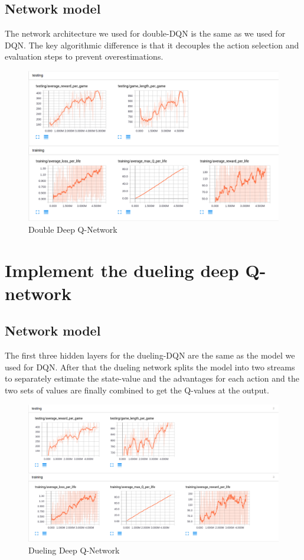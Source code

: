 \documentclass{article}
\begin{document}
\subsection*{Network model}
The network architecture we used for double-DQN is the same as we used for DQN. The key algorithmic difference is that it decouples the action selection and evaluation steps to prevent overestimations.

\begin{figure}[h]
\centering
\includegraphics[scale=0.3]{double.png}
\caption{Double Deep Q-Network}
\end{figure}

\section*{Implement the dueling deep Q-network}
\subsection*{Network model}
The first three hidden layers for the dueling-DQN are the same as the model we used for DQN. After that the dueling network splits the model into two streams to separately estimate the state-value and the advantages for each action and the two sets of values are finally combined to get the Q-values at the output.

\begin{figure}[h]
\centering

\includegraphics[scale=0.3]{duel.png}
\caption{Dueling Deep Q-Network}
\end{figure}
\end{document}
